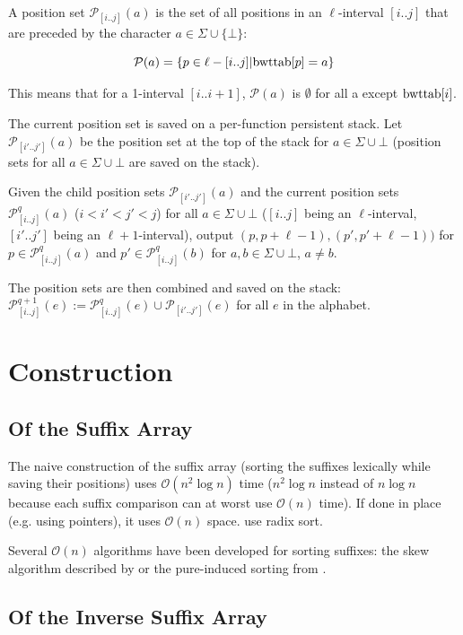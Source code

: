 \documentclass[a4paper,10pt]{article}
\begin{document}
A position set $\mathcal{P}_{[i..j]}(a)$ is the set of all positions in
an $\ell$-interval $[i..j]$ that are preceded by the character $a \in
\Sigma \cup \{\bot\}$:

$$\mathcal{P}(a)= \{ p \in \ell-[i..j] | \hbox{bwttab}[p]=a\}$$

This means that for a 1-interval $[i..i+1]$, $\mathcal{P}(a)$ is
$\emptyset$ for all a except $\hbox{bwttab}[i]$.

The current position set is saved on a per-function persistent stack. Let
$\mathcal{P}_{[i'..j']}(a)$ be the position set at the top of the stack
for $a \in \Sigma \cup \bot$ (position sets for all $a \in \Sigma \cup
\bot$ are saved on the stack).

Given the child position sets $\mathcal{P}_{[i'..j']}(a)$ and the current
position sets $\mathcal{P}^{q}_{[i..j]}(a)$ ($i<i'<j'<j$) for all $a
\in \Sigma \cup \bot$ ($[i..j]$ being an $\ell$-interval, $[i'..j']$
being an $\ell+1$-interval), output $(p, p+\ell-1), (p',p'+\ell-1))$ for
$p \in \mathcal{P}^{q}_{[i..j]}(a)$ and $p' \in \mathcal{P}^{q}_{[i..j]}(b)$
for $a, b \in \Sigma \cup \bot$, $a \not = b$.

The position sets are then combined and saved on the stack:
$\mathcal{P}^{q+1}_{[i..j]}(e):=\mathcal{P}^{q}_{[i..j]}(e) \cup
\mathcal{P}_{[i'..j']}(e)$ for all $e$ in the alphabet.

\section*{Construction}

\subsection*{Of the Suffix Array}

The naive construction of the suffix array (sorting the suffixes
lexically while saving their positions) uses $\mathcal{O}(n^2 \log n)$
time ($n^2 \log n$ instead of $n \log n$ because each suffix comparison
can at worst use $\mathcal{O}(n)$ time). If done in place (e.g. using
pointers), it uses $\mathcal{O}(n)$ space. \citealt{manber1993suffix} use
radix sort.

Several $\mathcal{O}(n)$ algorithms have been developed for sorting
suffixes: the skew algorithm described by \cite{karkkainen2003simple}
or the pure-induced sorting from \citealt{nong2009linear}.

\subsection*{Of the Inverse Suffix Array}
\end{document}
